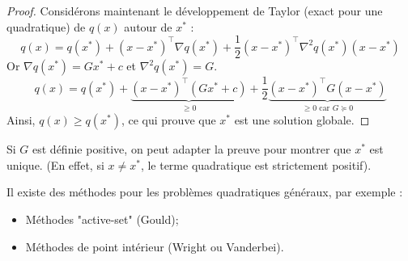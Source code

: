 \begin{proof}
        Considérons maintenant le développement de Taylor (exact pour une quadratique) de $q(x)$ autour de $x^*$ :
        \begin{equation}
            q(x) = q(x^*) + (x - x^*)^\top \nabla q(x^*) + \frac{1}{2} (x - x^*)^\top \nabla^2 q(x^*) (x - x^*)
        \end{equation}
        Or $\nabla q(x^*) = G x^* + c$ et $\nabla^2 q(x^*) = G$.
        \begin{equation}
            q(x) = q(x^*) + \underbrace{(x - x^*)^\top (G x^* + c)}_{\ge 0} + \frac{1}{2} \underbrace{(x - x^*)^\top G (x - x^*)}_{\ge 0 \text{ car } G \succeq 0}
        \end{equation}
        Ainsi, $q(x) \ge q(x^*)$, ce qui prouve que $x^*$ est une solution globale.
    \end{proof}

    \begin{remarque}
        Si $G$ est définie positive, on peut adapter la preuve pour montrer que $x^*$ est unique.
        (En effet, si $x \neq x^*$, le terme quadratique est strictement positif).
    \end{remarque}


\begin{remarque}
    Il existe des méthodes pour les problèmes quadratiques généraux, par exemple :
    \begin{itemize}
        \item Méthodes "active-set" (Gould);
        \item Méthodes de point intérieur (Wright ou Vanderbei).
    \end{itemize}
\end{remarque}

